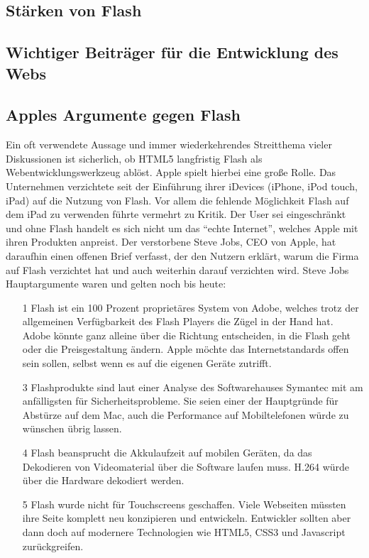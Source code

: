 \subsection{Stärken von Flash}
\subsection{Wichtiger Beiträger für die Entwicklung des Webs}
\subsection{Apples Argumente gegen Flash}
Ein oft verwendete Aussage und immer wiederkehrendes Streitthema vieler Diskussionen 
ist sicherlich, ob HTML5 langfristig Flash als Webentwicklungswerkzeug ablöst. Apple
spielt hierbei eine große Rolle. Das Unternehmen verzichtete seit der Einführung ihrer 
iDevices (iPhone, iPod touch, iPad) auf die Nutzung von Flash. Vor allem die fehlende Möglichkeit
Flash auf dem iPad zu verwenden führte vermehrt zu Kritik. Der User sei eingeschränkt und
ohne Flash handelt es sich nicht um das "`echte Internet"', welches Apple mit ihren Produkten
anpreist. Der verstorbene Steve Jobs, CEO von Apple, hat daraufhin einen offenen Brief 
verfasst, der den Nutzern erklärt, warum die Firma auf Flash verzichtet hat und auch
weiterhin darauf verzichten wird. Steve Jobs Hauptargumente waren und gelten noch bis
heute:
\begin{itemize}
	\item[1]{
		Flash ist ein 100 Prozent proprietäres System von Adobe, welches trotz der
		allgemeinen Verfügbarkeit des Flash Players die Zügel in der Hand hat.
		Adobe könnte ganz alleine über die Richtung entscheiden, in die Flash
		geht oder die Preisgestaltung ändern. Apple möchte das Internetstandards
		offen sein sollen, selbst wenn es auf die eigenen Geräte zutrifft.
	}
	\item[3]{
		Flashprodukte sind laut einer Analyse des Softwarehauses Symantec mit
		am anfälligsten für Sicherheitsprobleme. Sie seien einer der Hauptgründe
		für Abstürze auf dem Mac, auch die Performance auf Mobiltelefonen würde
		zu wünschen übrig lassen.
	}
	\item[4]{
		Flash beansprucht die Akkulaufzeit auf mobilen Geräten, da das Dekodieren
		von Videomaterial über die Software laufen muss. H.264 würde über die
		Hardware dekodiert werden.
	}
	\item[5]{
		Flash wurde nicht für Touchscreens geschaffen. Viele Webseiten müssten
		ihre Seite komplett neu konzipieren und entwickeln. Entwickler sollten
		aber dann doch auf modernere Technologien wie HTML5, CSS3 und
		Javascript zurückgreifen.
	}
\end{itemize}
